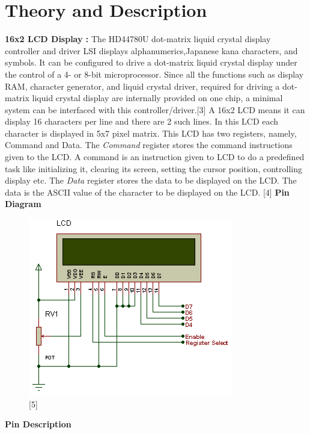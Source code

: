 \documentclass[11pt,a4paper]{article}
\begin{document}
	\newpage
	\section{Theory and Description}
	
	\textbf{16x2 LCD Display :}
	\vspace{0.3cm}
	\newline
	The HD44780U dot-matrix liquid crystal display controller and driver LSI displays alphanumerics,Japanese kana characters, and symbols. It can be configured to drive a dot-matrix liquid crystal display under the control of a 4- or 8-bit microprocessor. Since all the functions such as display RAM, character generator, and liquid crystal driver, required for driving a dot-matrix liquid crystal display are internally provided on one chip, a minimal system can be interfaced with this controller/driver.[3]
	\flushleft
	A 16x2 LCD means it can display 16 characters per line and there are 2 such lines. In this LCD each character is displayed in 5x7 pixel matrix. This LCD has two registers, namely, Command and Data. The \textit{Command} register stores the command instructions given to the LCD. A command is an instruction given to LCD to do a predefined task like initializing it, clearing its screen, setting the cursor position, controlling display etc. The \textit{Data} register stores the data to be displayed on the LCD. The data is the ASCII value of the character to be displayed on the LCD. [4]
	\vspace{0.3cm}
	\textbf{Pin Diagram}
    \begin{figure}[h!]
    	\includegraphics[scale=0.9]{lcd.png}
    	\centering
    	\caption{[5]}
    \end{figure} 
    	
	\newpage
	\flushleft
	\textbf{Pin Description }
	\vspace{0.3cm}
	
\end{document}
